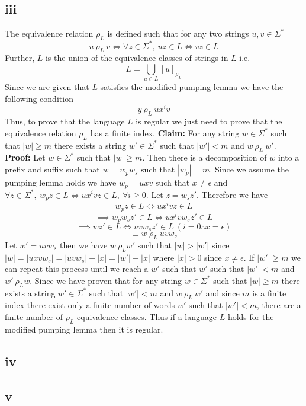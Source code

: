 \documentclass[12pt]{article}
\begin{document}
\subsection*{iii} The equivalence relation $\rho_L$ is defined such that
for any two strings $u, v \in \Sigma^*$
$$ u\ \rho_L\ v \iff \forall z \in \Sigma^*,\ uz \in L \iff vz \in L$$
Further, $L$ is the union of the equivalence classes of strings in $L$ i.e.
$$L = \bigcup _{u\in L} [u]_{\rho_L}$$
Since we are given that $L$ satisfies the modified pumping lemma we have the
following condition
$$y\ \rho_L\ ux^iv$$
Thus, to prove that the language $L$ is regular we just need to prove that the
equivalence relation $\rho_L$ has a finite index.
\newline
\textbf{Claim: } For any string $w \in \Sigma^*$ such that $|w| \ge m$ there
exists a string $w' \in \Sigma^*$ such that $|w'| < m$ and $w\ \rho_L\ w'$.
\newline
\textbf{Proof: } Let $w \in \Sigma^*$ such that $|w| \ge m$. Then there is a
decomposition of $w$ into a prefix and suffix such that $w = w_pw_s$ such that
$|w_p| = m$. Since we assume the pumping lemma holds we have $w_p = uxv$ such
that $x \neq \epsilon$ and
$\forall z \in \Sigma^*,\ w_pz \in L \iff ux^ivz \in L,\ \forall i \ge 0$.
Let $z = w_sz'$. Therefore we have
$$ w_pz \in L \iff ux^ivz \in L$$
$$\implies w_pw_sz' \in L \iff ux^ivw_sz' \in L$$
$$\implies wz' \in L \iff uvw_sz' \in L\ (i = 0 \therefore x = \epsilon)$$
$$\equiv w\ \rho_L\ uvw_s$$
Let $w' = uvw_s$ then we have $w\ \rho_L w'$ such that $|w| > |w'|$ since
$|w| = |uxvw_s| = |uvw_s|+|x| = |w'| +|x|$ where $|x| > 0$ since
$x \neq \epsilon$. If $|w'| \ge m$ we can repeat this process until we reach a
$w'$ such that $w'$ such that $|w'| < m$ and $w'\ \rho_L w$.
Since we have proven that for any string $w \in \Sigma^*$ such that $|w| \ge m$
there exists a string $w' \in \Sigma^*$ such that $|w'| < m$ and $w\ \rho_L\ w'$
and since $m$ is a finite index there exist only a finite number of words $w'$
such that $|w'| < m$, there are a finite number of $\rho_L$ equivalence classes.
Thus if a language $L$ holds for the modified pumping lemma then it is regular.

\subsection*{iv}
\subsection*{v}
\end{document}
